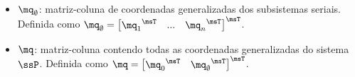 \documentclass[]{politex}
\begin{document}
\begin{itemize}
\item $\mq_\emptyset$: matriz-coluna de coordenadas generalizadas dos subsistemas seriais. Definida como $\mq_\emptyset = \begin{bmatrix}  {\mq_1}^\msT & ... & {\mq_{n}}^\msT \end{bmatrix}^\msT $.
\item $\mq$: matriz-coluna contendo todas as coordenadas generalizadas do sistema $\ssP$. Definida como $\mq = \begin{bmatrix} {\mq_0}^\msT & {\mq_\emptyset}^\msT \end{bmatrix}^\msT $.

\end{itemize}
\end{document}
